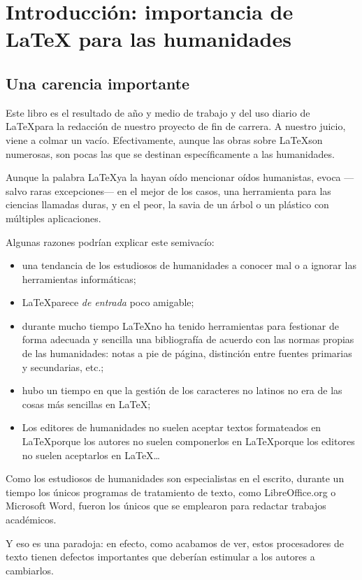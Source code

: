 
\chapter[Introduction]{Introducción: importancia de \LaTeX{} para las humanidades}


\section{Una carencia importante}

Este libro es el resultado de año y medio de trabajo y del uso diario de \LaTeX para la redacción de nuestro proyecto de fin de carrera. A nuestro juicio, viene a colmar un vacío. Efectivamente, aunque las obras sobre \LaTeX son numerosas, son pocas las que se destinan específicamente a las humanidades. 

Aunque la palabra \LaTeX ya la hayan oído mencionar oídos humanistas, evoca ---salvo raras excepciones---  en el mejor de los casos, una herramienta para las ciencias llamadas duras, y en el peor, la savia de un árbol o un plástico con múltiples aplicaciones. 

Algunas razones podrían explicar este semivacío:
\begin{itemize}
\item una tendancia de los estudiosos de humanidades a conocer mal o a ignorar las herramientas informáticas;
\item \LaTeX parece \emph{de entrada} poco amigable;
\item durante mucho tiempo \LaTeX no ha tenido herramientas para festionar de forma adecuada y sencilla una bibliografía de acuerdo con las normas propias de las humanidades: notas a pie de página, distinción entre fuentes primarias y secundarias, etc.;
\item hubo un tiempo en que la gestión de los caracteres no latinos no era de las cosas más sencillas en \LaTeX ;
\item Los editores de humanidades no suelen aceptar textos formateados en \LaTeX porque los autores no suelen componerlos en \LaTeX porque los editores no suelen aceptarlos en \LaTeX\ldots
\end{itemize}

Como los estudiosos de humanidades son especialistas en el escrito, durante un tiempo los únicos programas de tratamiento de texto, como  LibreOffice.org o Microsoft Word, fueron los únicos que se emplearon para redactar trabajos académicos.

Y eso es una paradoja: en efecto, como acabamos de ver, estos procesadores de texto tienen defectos importantes que deberían estimular a los autores a cambiarlos. 

